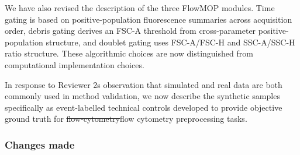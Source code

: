 \documentclass[
  11pt,
  a4paper,
]{article}
\begin{document}
We have also revised the description of the three FlowMOP modules. Time
gating is based on positive-population fluorescence summaries across
acquisition order, debris gating derives an FSC-A threshold from
cross-parameter positive-population structure, and doublet gating uses
FSC-A/FSC-H and SSC-A/SSC-H ratio structure. These algorithmic choices
are now distinguished from computational implementation choices.

In response to Reviewer 2\textquotesingle s observation that simulated
and real data are both commonly used in method validation, we now
describe the synthetic samples specifically as event-labelled technical
controls developed to provide objective ground truth for
{\color{revisionred}\sout{flow-cytometry}}{\color{revisionblue}flow
cytometry} preprocessing tasks.

\subsubsection{Changes made}\label{changes-made}
\end{document}
